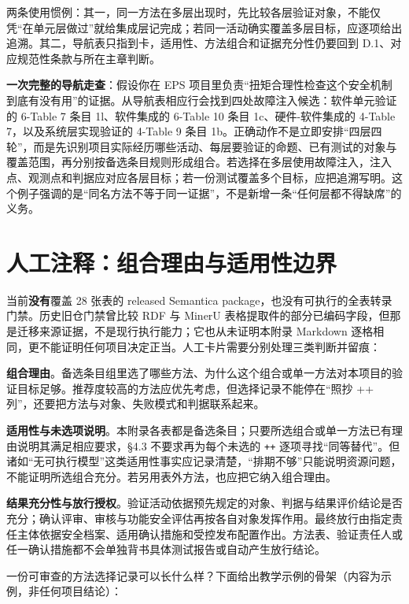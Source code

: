 两条使用惯例：其一，同一方法在多层出现时，先比较各层验证对象，不能仅凭“在单元层做过”就给集成层记完成；若同一活动确实覆盖多层目标，应逐项给出追溯。其二，导航表只指到卡，适用性、方法组合和证据充分性仍要回到 D.1、对应规范性条款与所在主章判断。

\textbf{一次完整的导航走查}：假设你在 EPS 项目里负责“扭矩合理性检查这个安全机制到底有没有用”的证据。从导航表相应行会找到四处故障注入候选：软件单元验证的 6-Table 7 条目 1l、软件集成的 6-Table 10 条目 1c、硬件-软件集成的 4-Table 7，以及系统层实现验证的 4-Table 9 条目 1b。正确动作不是立即安排“四层四轮”，而是先识别项目实际经历哪些活动、每层要验证的命题、已有测试的对象与覆盖范围，再分别按备选条目规则形成组合。若选择在多层使用故障注入，注入点、观测点和判据应对应各层目标；若一份测试覆盖多个目标，应把追溯写明。这个例子强调的是“同名方法不等于同一证据”，不是新增一条“任何层都不得缺席”的义务。

\section{人工注释：组合理由与适用性边界}

当前\textbf{没有}覆盖 28 张表的 released Semantica package，也没有可执行的全表转录门禁。历史旧仓门禁曾比较 RDF 与 MinerU 表格提取件的部分已编码字段，但那是迁移来源证据，不是现行执行能力；它也从未证明本附录 Markdown 逐格相同，更不能证明任何项目决定正当。人工卡片需要分别处理三类判断并留痕：

\textbf{组合理由}。备选条目组里选了哪些方法、为什么这个组合或单一方法对本项目的验证目标足够。推荐度较高的方法应优先考虑，但选择记录不能停在“照抄 ++ 列”，还要把方法与对象、失败模式和判据联系起来。

\textbf{适用性与未选项说明}。本附录各表都是备选条目；只要所选组合或单一方法已有理由说明其满足相应要求，§4.3 不要求再为每个未选的 \nolinkurl{++} 逐项寻找“同等替代”。但诸如“无可执行模型”这类适用性事实应记录清楚，“排期不够”只能说明资源问题，不能证明所选组合充分。若另用表外方法，也应把它纳入组合理由。

\textbf{结果充分性与放行授权}。验证活动依据预先规定的对象、判据与结果评价结论是否充分；确认评审、审核与功能安全评估再按各自对象发挥作用。最终放行由指定责任主体依据安全档案、适用确认措施和受控发布配置作出。方法表、验证责任人或任一确认措施都不会单独背书具体测试报告或自动产生放行结论。

一份可审查的方法选择记录可以长什么样？下面给出教学示例的骨架（内容为示例，非任何项目结论）：

